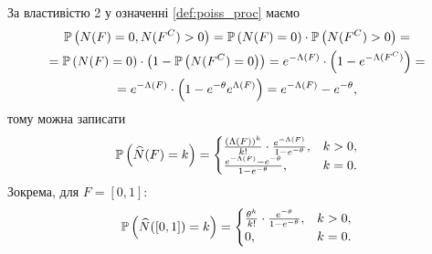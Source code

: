 За властивістю 2 у означенні \ref{def:poiss_proc} маємо
\begin{gather*}
    \P{N(F) = 0, N(F^C) > 0} = \P{N(F) = 0}\cdot \P{N(F^C) > 0} = \\ =
    \P{N(F) = 0} \cdot \left(1 - \P{N(F^C) = 0}\right) = 
    e^{-\Lambda(F)} \cdot \left(1 - e^{-\Lambda(F^C)}\right) = \\ =
    e^{-\Lambda(F)} \cdot \left(1 - e^{-\theta} e^{\Lambda(F)}\right) = 
    e^{-\Lambda(F)} - e^{-\theta},
\end{gather*}
тому можна записати
\begin{gather}
    \P{\widehat{N} (F) = k} =
    \begin{cases}
        \frac{(\Lambda(F))^k}{k!} \cdot \frac{e^{-\Lambda(F)}}{1 - e^{-\theta}}, & k > 0, \\
        \frac{e^{-\Lambda(F)} - e^{-\theta}}{1 - e^{-\theta}}, & k = 0.
    \end{cases}
\end{gather}
Зокрема, для $F = [0, 1]$:
\begin{gather}
    \P{\widehat{N} ([0, 1]) = k} = 
    \begin{cases}
        \frac{\theta^k}{k!} \cdot \frac{e^{-\theta}}{1 - e^{-\theta}}, & k > 0, \\
        0, & k = 0.
    \end{cases}
\end{gather}

